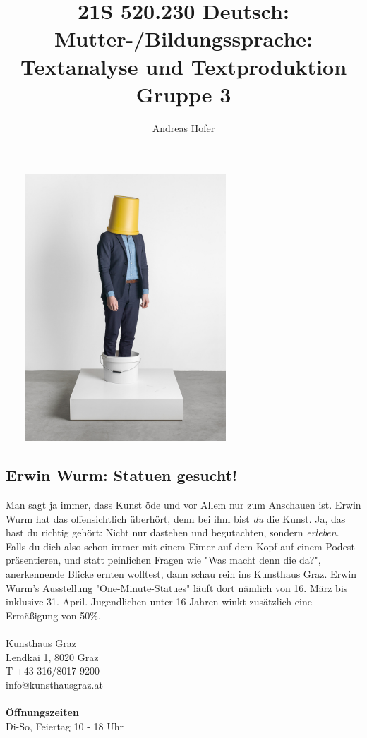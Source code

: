 \documentclass{article}
\title{\vspace{-3cm}21S 520.230 Deutsch: Mutter-/Bildungssprache: Textanalyse und Textproduktion Gruppe 3}
\author{Andreas Hofer}
\begin{document}
	\begin{multicols}{2}
	\includegraphics[width=90mm, height=100mm]{Eimer.jpg} \\
	\subsection*{Erwin Wurm: Statuen gesucht!}
	Man sagt ja immer, dass Kunst öde und vor Allem nur zum Anschauen ist. Erwin Wurm hat das offensichtlich überhört, denn bei ihm bist \textit{du} die Kunst. Ja, das hast du richtig gehört: Nicht nur dastehen und begutachten, sondern \textit{erleben}. Falls du dich also schon immer mit einem Eimer auf dem Kopf auf einem Podest präsentieren, und statt peinlichen Fragen wie "Was macht denn die da?", anerkennende Blicke ernten wolltest, dann schau rein ins Kunsthaus Graz. Erwin Wurm's Ausstellung "One-Minute-Statues" läuft dort nämlich von 16. März bis inklusive 31. April. Jugendlichen unter 16 Jahren winkt zusätzlich eine Ermäßigung von 50\%. \\ \\
	Kunsthaus Graz \\
	Lendkai 1, 8020 Graz \\
	T +43-316/8017-9200 \\
	info@kunsthausgraz.at \\ \\
	\textbf{Öffnungszeiten} \\
	Di-So, Feiertag 10 - 18 Uhr \\


\end{multicols}
\end{document}
